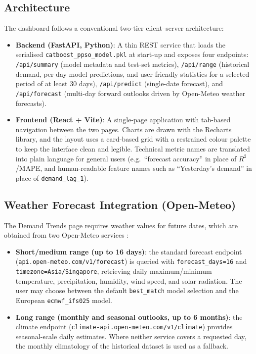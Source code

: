 \subsection{Architecture}

The dashboard follows a conventional two-tier client--server architecture:

\begin{itemize}
    \item \textbf{Backend (FastAPI, Python)}: A thin REST service that loads the serialised \texttt{catboost\_ppso\_model.pkl} at start-up and exposes four endpoints: \texttt{/api/summary} (model metadata and test-set metrics), \texttt{/api/range} (historical demand, per-day model predictions, and user-friendly statistics for a selected period of at least 30 days), \texttt{/api/predict} (single-date forecast), and \texttt{/api/forecast} (multi-day forward outlooks driven by Open-Meteo weather forecasts).
    \item \textbf{Frontend (React + Vite)}: A single-page application with tab-based navigation between the two pages. Charts are drawn with the Recharts library, and the layout uses a card-based grid with a restrained colour palette to keep the interface clean and legible. Technical metric names are translated into plain language for general users (e.g.\ ``forecast accuracy'' in place of $R^2$/MAPE, and human-readable feature names such as ``Yesterday's demand'' in place of \texttt{demand\_lag\_1}).
\end{itemize}

\subsection{Weather Forecast Integration (Open-Meteo)}

The Demand Trends page requires weather values for future dates, which are obtained from two Open-Meteo services \parencite{openmeteo2025api}:

\begin{itemize}
    \item \textbf{Short/medium range (up to 16 days)}: the standard forecast endpoint (\texttt{api.open-meteo.com/v1/forecast}) is queried with \texttt{forecast\_days=16} and \texttt{timezone=Asia/Singapore}, retrieving daily maximum/minimum temperature, precipitation, humidity, wind speed, and solar radiation. The user may choose between the default \texttt{best\_match} model selection and the European \texttt{ecmwf\_ifs025} model.
    \item \textbf{Long range (monthly and seasonal outlooks, up to 6 months)}: the climate endpoint (\texttt{climate-api.open-meteo.com/v1/climate}) provides seasonal-scale daily estimates. Where neither service covers a requested day, the monthly climatology of the historical dataset is used as a fallback.
\end{itemize}

